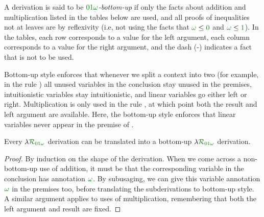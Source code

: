 \begin{definition}\label{def:DILL-bottom-up}
  A derivation is said to be \emph{$\instDILL$-bottom-up} if only the facts
  about addition and multiplication listed in the tables below are used,
  and all proofs of
  inequalities not at leaves are by reflexivity (i.e, not using the facts that
  $\gr\omega \leq \gr0$ and $\gr\omega \leq \gr1$).
  In the tables, each row corresponds to a value for the left argument, each
  column corresponds to a value for the right argument, and the dash (-)
  indicates a fact that is not to be used.

\end{definition}

Bottom-up style enforces that whenever we split a context into two (for
example, in the rule ) all unused variables in the
conclusion stay unused in the premises, intuitionistic variables stay
intuitionistic, and linear variables go either left or right.
Multiplication is only used in the rule , at which point
both the result and left argument are available.
Here, the bottom-up style enforces that linear variables never appear in the
premise of .

\begin{lemma}\label{thm:DILL-bottom-up}
  Every $\name_{\instDILL}$ derivation can be translated into a bottom-up
  $\name_{\instDILL}$ derivation.
\end{lemma}
\begin{proof}
  By induction on the shape of the derivation.
  When we come across a non-bottom-up use of addition, it must be that the
  corresponding variable in the conclusion has annotation $\gr\omega$.
  By subusaging, we can give this variable annotation $\gr\omega$ in
  the premises too, before translating the subderivations to bottom-up
  style.
  A similar argument applies to uses of multiplication, remembering that both
  the left argument and result are fixed.
\end{proof}

